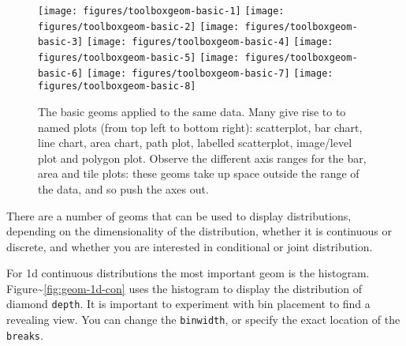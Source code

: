 \begin{figure}
\texttt{[image: figures/toolboxgeom-basic-1]} \texttt{[image: figures/toolboxgeom-basic-2]} \texttt{[image: figures/toolboxgeom-basic-3]} \texttt{[image: figures/toolboxgeom-basic-4]} \texttt{[image: figures/toolboxgeom-basic-5]} \texttt{[image: figures/toolboxgeom-basic-6]} \texttt{[image: figures/toolboxgeom-basic-7]} \texttt{[image: figures/toolboxgeom-basic-8]} \caption{The basic geoms applied to the same data. Many give rise to to named plots (from top left to bottom right): scatterplot, bar chart, line chart, area chart, path plot, labelled scatterplot, image/level plot and polygon plot. Observe the different axis ranges for the bar, area and tile plots: these geoms take up space outside the range of the data, and so push the axes out.\label{fig:geom-basic}}
\end{figure}


There are a number of geoms that can be used to display distributions,
depending on the dimensionality of the distribution, whether it is
continuous or discrete, and whether you are interested in conditional or
joint distribution. 

For 1d continuous distributions the most important geom is the
histogram. Figure\textasciitilde{}\ref{fig:geom-1d-con} uses the
histogram to display the distribution of diamond \texttt{depth}. It is
important to experiment with bin placement to find a revealing view. You
can change the \texttt{binwidth}, or specify the exact location of the
\texttt{breaks}.  

\begin{Shaded}
\begin{Highlighting}[]
\NormalTok{)}
\NormalTok{, }\NormalTok{(}\NormalTok{, }\NormalTok{), }\NormalTok{)}
\end{Highlighting}
\end{Shaded}

